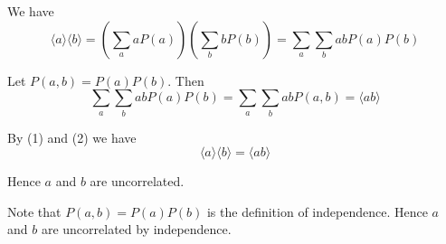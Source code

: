 


\bigskip
We have
\begin{equation*}
\langle a\rangle\langle b\rangle
=\left(\sum_aaP(a)\right)\left(\sum_bbP(b)\right)
=\sum_a\sum_babP(a)P(b)
\tag{1}
\end{equation*}

Let $P(a,b)=P(a)P(b)$.
Then
\begin{equation*}
\sum_a\sum_babP(a)P(b)=\sum_a\sum_babP(a,b)=\langle ab\rangle
\tag{2}
\end{equation*}

By (1) and (2) we have
\begin{equation*}
\langle a\rangle\langle b\rangle=\langle ab\rangle
\end{equation*}

Hence $a$ and $b$ are uncorrelated.

\bigskip
Note that $P(a,b)=P(a)P(b)$ is the definition of independence.
Hence $a$ and $b$ are uncorrelated by independence.


